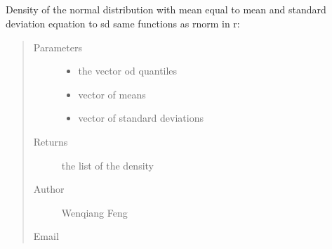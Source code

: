 \documentclass[letterpaper,12pt,english]{sphinxmanual}
\begin{document}
\subsection{}
\label{\detokenize{api:dnorm}}

\begin{fulllineitems}
Density of the normal distribution with mean
equal to mean and standard deviation equation to sd
same functions as rnorm in r: 
\begin{quote}\begin{description}
\item[{Parameters}] \leavevmode\begin{itemize}
\item {} 
 \textendash{} the vector od quantiles

\item {} 
 \textendash{} vector of means

\item {} 
 \textendash{} vector of standard deviations

\end{itemize}

\item[{Returns}] \leavevmode
the list of the density

\item[{Author}] \leavevmode
Wenqiang Feng

\item[{Email}] \leavevmode
{}

\end{description}\end{quote}

\end{fulllineitems}



\subsection{}
\label{\detokenize{api:runif}}
\end{document}
